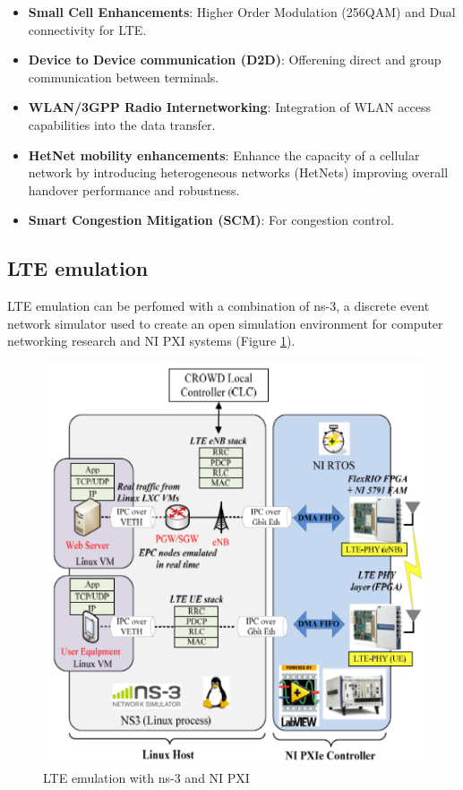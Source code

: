 \begin{itemize}
\item{\textbf{Small Cell Enhancements}: Higher Order Modulation (256QAM) and Dual connectivity for LTE.}
\item{\textbf{Device to Device communication (D2D)}: Offerening direct and group communication between terminals.}
\item{\textbf{WLAN/3GPP Radio Internetworking}: Integration of WLAN access capabilities into  the data transfer.}
\item{\textbf{HetNet mobility enhancements}: Enhance the capacity of a cellular network by introducing heterogeneous networks (HetNets) improving overall handover performance and robustness.}
\item{\textbf{Smart Congestion Mitigation (SCM)}: For congestion control.}
\end{itemize}

\subsection{LTE emulation}\label{sec:chap2_lte_emu}

LTE emulation can be perfomed with a combination of ns-3, a discrete event network simulator used to create an open simulation environment for computer networking research and NI PXI systems \cite{ni_pxi_wp} (Figure \ref{pxi-fig}).

\begin{center}
\begin{figure}[h!]
  \centering
    \includegraphics[scale=0.7]{./images/pxi}
	\caption{LTE emulation with ns-3 and NI PXI}
	\label{pxi-fig}
\end{figure}
\end{center}


